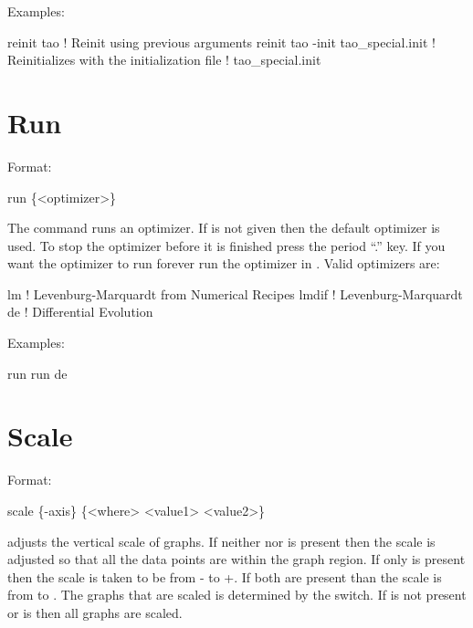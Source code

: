 Examples:
\begin{example}
  reinit tao                         ! Reinit using previous arguments
  reinit tao -init tao_special.init  ! Reinitializes \tao with the initialization file 
                                     !   tao_special.init
\end{example}


\section{Run}
\label{s:run}

Format:
\begin{example}
  run \{<optimizer>\}
\end{example}

\vskip 0.2in 
The  command runs an optimizer. If  is not
given then the default optimizer is used. To stop the optimizer before
it is finished press the period ``.''  key. If you want the optimizer
to run forever run the optimizer in . Valid optimizers
are:
\begin{example}
  lm            ! Levenburg-Marquardt from Numerical Recipes 
  lmdif         ! Levenburg-Marquardt 
  de            ! Differential Evolution
\end{example}

Examples:
\begin{example}
  run 
  run de
\end{example}

\section{Scale}
\label{s:scale}

Format:
\begin{example}
  scale \{-axis\} \{<where> <value1> <value2>\}
\end{example}

\vskip 0.2in 
 adjusts the vertical scale of graphs. If neither
 nor  is present then the scale is adjusted
so that all the data points are within the graph region.  If only
 is present then the scale is taken to be from
- to +. If both are present than the scale
is from  to .  The graphs that are scaled is
determined by the  switch. If  is not present
or  is  then all graphs are scaled.

